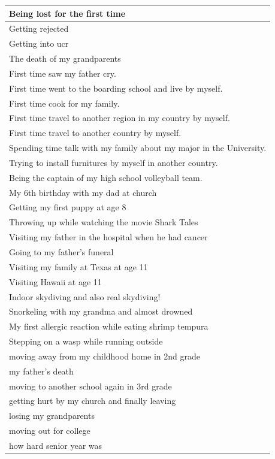 \documentclass[
  .7em,
  letterpaper,
  DIV=11,
  numbers=noendperiod]{scrartcl}
\begin{document}
\begin{table}
\begin{tabular}{l}
\hline
Being lost for the first time\\
\hline
Getting rejected\\
\hline
Getting into ucr\\
\hline
The death of my grandparents\\
\hline
First time saw my father cry.\\
\hline
First time went to the boarding school and live by myself.\\
\hline
First time cook for my family.\\
\hline
First time travel to another region in my country by myself.\\
\hline
First time travel to another country by myself.\\
\hline
Spending time talk with my family about my major in the University.\\
\hline
Trying to install furnitures by myself in another country.\\
\hline
Being the captain of my high school volleyball team.\\
\hline
My 6th birthday with my dad at church\\
\hline
Getting my first puppy at age 8\\
\hline
Throwing up while watching the movie Shark Tales\\
\hline
Visiting my father in the hospital when he had cancer\\
\hline
Going to my father's funeral\\
\hline
Visiting my family at Texas at age 11\\
\hline
Visiting Hawaii at age 11\\
\hline
Indoor skydiving and also real skydiving!\\
\hline
Snorkeling with my grandma and almost drowned\\
\hline
My first allergic reaction while eating shrimp tempura\\
\hline
Stepping on a wasp while running outside\\
\hline
moving away from my childhood home in 2nd grade\\
\hline
my father's death\\
\hline
moving to another school again in 3rd grade\\
\hline
getting hurt by my church and finally leaving\\
\hline
losing my grandparents\\
\hline
moving out for college\\
\hline
how hard senior year was\\

\end{tabular}
\end{table}
\end{document}
